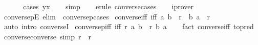 \begin{isabellebody}
\ \ %
\isanewline
%
\isadelimproof
\ \ %
\endisadelimproof
%
\isatagproof
{}\isamarkupfalse%
\ {\isacharparenleft}{\kern0pt}cases\ yx{\isacharparenright}{\kern0pt}\isanewline
\ \ \isamarkupfalse%
\ simp\isanewline
\ \ \isamarkupfalse%
\ {\isacharparenleft}{\kern0pt}erule\ converse{\isachardot}{\kern0pt}cases{\isacharparenright}{\kern0pt}\isanewline
\ \ \isamarkupfalse%
\ iprover\isanewline
\ \ \isamarkupfalse%
%
\endisatagproof
{\isafoldproof}%
%
\isadelimproof
\isanewline
%
\endisadelimproof
\isanewline
{}\isamarkupfalse%
\ conversepE\ {\isacharbrackleft}{\kern0pt}elim{\isacharbang}{\kern0pt}{\isacharbrackright}{\kern0pt}\ {\isacharequal}{\kern0pt}\ conversep{\isachardot}{\kern0pt}cases\isanewline
\isanewline
{}\isamarkupfalse%
\ converse{\isacharunderscore}{\kern0pt}iff\ {\isacharbrackleft}{\kern0pt}iff{\isacharbrackright}{\kern0pt}{\isacharcolon}{\kern0pt}\ {\isachardoublequoteopen}{\isacharparenleft}{\kern0pt}a{\isacharcomma}{\kern0pt}\ b{\isacharparenright}{\kern0pt}\ {\isasymin}\ r{\isasyminverse}\ {\isasymlongleftrightarrow}\ {\isacharparenleft}{\kern0pt}b{\isacharcomma}{\kern0pt}\ a{\isacharparenright}{\kern0pt}\ {\isasymin}\ r{\isachardoublequoteclose}\isanewline
%
\isadelimproof
\ \ %
\endisadelimproof
%
\isatagproof
{}\isamarkupfalse%
\ {\isacharparenleft}{\kern0pt}auto\ intro{\isacharcolon}{\kern0pt}\ converseI{\isacharparenright}{\kern0pt}%
\endisatagproof
{\isafoldproof}%
%
\isadelimproof
\isanewline
%
\endisadelimproof
\isanewline
{}\isamarkupfalse%
\ conversep{\isacharunderscore}{\kern0pt}iff\ {\isacharbrackleft}{\kern0pt}iff{\isacharbrackright}{\kern0pt}{\isacharcolon}{\kern0pt}\ {\isachardoublequoteopen}r{\isasyminverse}{\isasyminverse}\ a\ b\ {\isacharequal}{\kern0pt}\ r\ b\ a{\isachardoublequoteclose}\isanewline
%
\isadelimproof
\ \ %
\endisadelimproof
%
\isatagproof
{}\isamarkupfalse%
\ {\isacharparenleft}{\kern0pt}fact\ converse{\isacharunderscore}{\kern0pt}iff\ {\isacharbrackleft}{\kern0pt}to{\isacharunderscore}{\kern0pt}pred{\isacharbrackright}{\kern0pt}{\isacharparenright}{\kern0pt}%
\endisatagproof
{\isafoldproof}%
%
\isadelimproof
\isanewline
%
\endisadelimproof
\isanewline
{}\isamarkupfalse%
\ converse{\isacharunderscore}{\kern0pt}converse\ {\isacharbrackleft}{\kern0pt}simp{\isacharbrackright}{\kern0pt}{\isacharcolon}{\kern0pt}\ {\isachardoublequoteopen}{\isacharparenleft}{\kern0pt}r{\isasyminverse}{\isacharparenright}{\kern0pt}{\isasyminverse}\ {\isacharequal}{\kern0pt}\ r{\isachardoublequoteclose}\isanewline

\end{isabellebody}

